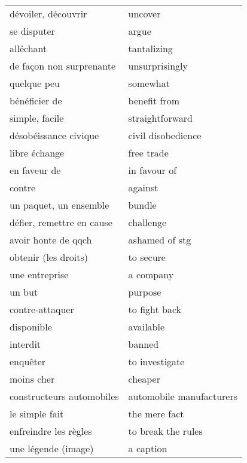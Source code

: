 \documentclass[
  10pt,
]{article}
\begin{document}
\begin{longtable}{ll}
dévoiler, découvrir & uncover\\

\rowcolor{gray!6}  se disputer & argue\\

alléchant & tantalizing\\

\rowcolor{gray!6}  de façon non surprenante & unsurprisingly\\

quelque peu & somewhat\\

\rowcolor{gray!6}  bénéficier de & benefit from\\

simple, facile & straightforward\\

\rowcolor{gray!6}  désobéissance civique & civil disobedience\\

libre échange & free trade\\

\rowcolor{gray!6}  en faveur de & in favour of\\

contre & against\\

\rowcolor{gray!6}  un paquet, un ensemble & bundle\\

défier, remettre en cause & challenge\\

\rowcolor{gray!6}  avoir honte de qqch & ashamed of stg\\

obtenir (les droits) & to secure\\

\rowcolor{gray!6}  une entreprise & a company\\

un but & purpose\\

\rowcolor{gray!6}  contre-attaquer & to fight back\\

disponible & available\\

\rowcolor{gray!6}  interdit & banned\\

enquêter & to investigate\\

\rowcolor{gray!6}  moins cher & cheaper\\

constructeurs automobiles & automobile manufacturers\\

\rowcolor{gray!6}  le simple fait & the mere fact\\

enfreindre les règles & to break the rules\\

\rowcolor{gray!6}  une légende (image) & a caption\\
\bottomrule
\end{longtable}
\end{document}
